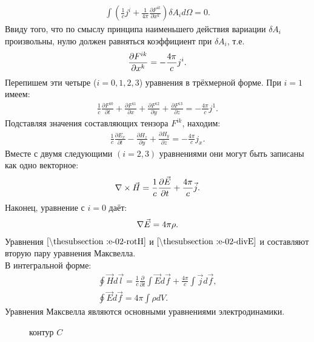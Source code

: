 \documentclass[__main__.tex]{subfiles}
\begin{document}
\begin{gather*}
    \int(\frac{1}{c}j^i + \frac{1}{4\pi}\frac{\partial F^{ik}}{\partial x^k})\delta A_id\Omega = 0.
\end{gather*}
Ввиду того, что по смыслу принципа наименьшего действия вариации $\delta A_i$ произвольны, нулю должен равняться коэффициент при $\delta A_i$, т.е.
\begin{gather}
    \llabel{e-02-deltaF}
    \frac{\partial F^{ik}}{\partial x^k} = -\frac{4\pi}{c}j^i.
\end{gather}
Перепишем эти четыре ($i = 0, 1, 2, 3$) уравнения в трёхмерной форме. При $i=1$ имеем:
\begin{gather*}
    \frac{1}{c}\frac{\partial F^{10}}{\partial t} + \frac{\partial F^{11}}{\partial x} + \frac{\partial F^{12}}{\partial y} + \frac{\partial F^{13}}{\partial z} = -\frac{4\pi}{c}j^1.
\end{gather*}
Подставляя значения составляющих тензора $F^{ik}$, находим:
\begin{gather*}
    \frac{1}{c}\frac{\partial E_x}{\partial t} - \frac{\partial H_z}{\partial y} + \frac{\partial H_y}{\partial z} = -\frac{4\pi}{c}j_x.
\end{gather*}
Вместе с двумя следующими $(i = 2, 3)$ уравнениями они могут быть записаны как одно векторное:
\begin{gather}
    \llabel{e-02-rotH}
    \nabla\times\vec{H}=\frac{1}{c}\frac{\partial\vec{E}}{\partial t} + \frac{4\pi}{c}\vec{j}.
\end{gather}
Наконец, уравнение с $i=0$ даёт:
\begin{gather}
    \llabel{e-02-divE}
    \nabla\vec{E}=4\pi\rho.
\end{gather}
Уравнения $\lref{e-02-rotH}$ и $\lref{e-02-divE}$ и составляют вторую пару уравнения Максвелла.\\
В интегральной форме:\\
\begin{gather*}
    \oint\vec{H}d\vec{l}=\frac{1}{c}\frac{\partial}{\partial t}\int\vec{E}d\vec{f}+\frac{4\pi}{c}\int\vec{j}d\vec{f},\\
    \oint\vec{E}d\vec{f}=4\pi\int\rho{dV}.
\end{gather*}
Уравнения Максвелла являются основными уравнениями электродинамики.\\
\begin{wrapfigure}{r}{.3\linewidth}
    \centering
    \def\svgwidth{1\linewidth}
    
    \caption{контур $C$}
\end{wrapfigure}
\end{document}
